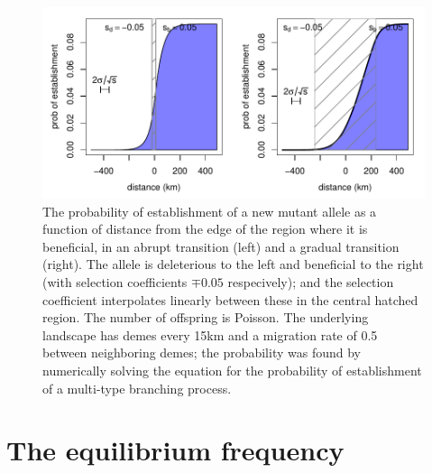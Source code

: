 \documentclass{article}
\begin{document}
\begin{figure}[ht!]
    \begin{center}
        \includegraphics{prob-establishment}
    \end{center}
    \caption{The probability of establishment of a new mutant allele as a function of distance from the edge of the region where it is beneficial,
    in an abrupt transition (left) and a gradual transition (right).
    The allele is deleterious to the left and beneficial to the right (with selection coefficients $\mp 0.05$ respecively);
    and the selection coefficient interpolates linearly between these in the central hatched region.
    The number of offspring is Poisson.
    The underlying landscape has demes every 15km and a migration rate of 0.5 between neighboring demes;
    the probability was found by numerically solving the equation for the probability of establishment of a multi-type branching process.
    \label{fig:prob_estab_calcs}
    }
\end{figure}


\section{The equilibrium frequency}
\label{apx:eqfreq}
\end{document}

